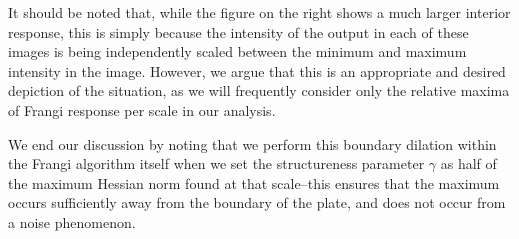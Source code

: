     It should be noted that, while the figure on the right shows a much larger interior response, this is simply because the intensity of the output in each of these
    images is being independently scaled between the minimum and maximum intensity in the image. However, we argue that this is an appropriate and desired depiction of the situation, as we will frequently consider only the relative maxima of Frangi response per scale in our analysis.
    
    We end our discussion by noting that we perform this boundary dilation within the
    Frangi algorithm itself when we set the structureness parameter $\gamma$ as half of the maximum Hessian norm found at that scale--this ensures that the maximum occurs sufficiently away from the boundary of the plate, and does not occur from a noise phenomenon.

    
    
%    
    
